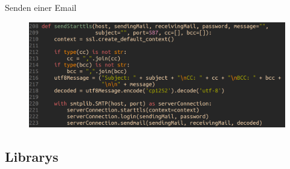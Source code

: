 \documentclass[aspectratio=169]{beamer}
\begin{document}
\begin{frame}[plain]{Senden einer Email}
    \begin{figure}[h]
        \includegraphics[width=.4\textwidth]{media/codeFragment.png}
    \end{figure}
\end{frame}


\subsection{Librarys}
\end{document}
